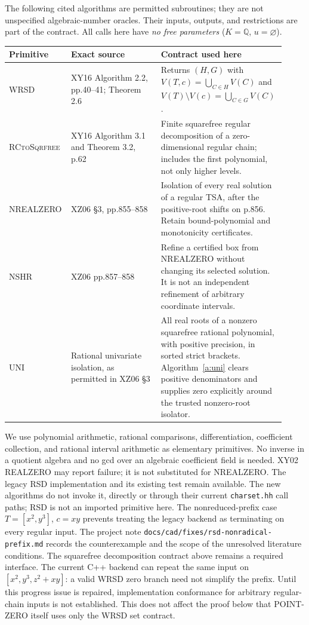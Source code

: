 \documentclass[11pt]{article}
\theoremstyle{definition}
\newcommand{\QQ}{\mathbb Q}
\newcommand{\alg}[1]{\textsc{#1}}
\begin{document}
The following cited algorithms are permitted subroutines; they are not unspecified
algebraic-number oracles. Their inputs, outputs, and restrictions are part of the
contract. All calls here have \emph{no free parameters} ($K=\QQ$, $u=\varnothing$).
\begin{longtable}{p{0.20\linewidth}p{0.32\linewidth}p{0.40\linewidth}}
\toprule Primitive & Exact source & Contract used here\\\midrule
\endhead
\alg{WRSD} & XY16 Algorithm 2.2, pp.40--41; Theorem 2.6 &
Returns $(H,G)$ with $V(T,c)=\bigcup_{C\in H}V(C)$ and
$V(T)\setminus V(c)=\bigcup_{C\in G}V(C)$.\\
\alg{RCtoSqrfree} & XY16 Algorithm 3.1 and Theorem 3.2, p.62 &
Finite squarefree regular decomposition of a zero-dimensional regular chain;
includes the first polynomial, not only higher levels.\\
\alg{NREALZERO} & XZ06 \S3, pp.855--858 &
Isolation of every real solution of a regular TSA, after the positive-root shifts
on p.856. Retain bound-polynomial and monotonicity certificates.\\
\alg{NSHR} & XZ06 pp.857--858 &
Refine a certified box from NREALZERO without changing its selected solution.
It is not an independent refinement of arbitrary coordinate intervals.\\
\alg{UNI} & Rational univariate isolation, as permitted in XZ06 \S3 &
All real roots of a nonzero squarefree rational polynomial, with positive
precision, in sorted strict brackets. Algorithm~\ref{a:uni} clears positive
denominators and supplies zero explicitly around the trusted nonzero-root isolator.\\
\bottomrule
\end{longtable}
We use polynomial arithmetic, rational comparisons, differentiation, coefficient
collection, and rational interval arithmetic as elementary primitives. No inverse
in a quotient algebra and no gcd over an algebraic coefficient field is needed.
XY02 REALZERO may report failure; it is not substituted for NREALZERO.
The legacy RSD implementation and its existing test remain available.
The new algorithms do not invoke it, directly or through their current
\texttt{charset.hh} call paths; RSD is not an imported primitive here.
The nonreduced-prefix case $T=[x^2,y^3]$, $c=xy$ prevents treating the
legacy backend as terminating on every regular input. The project note
\texttt{docs/cad/fixes/rsd-nonradical-prefix.md} records the counterexample
and the scope of the unresolved literature conditions.
The squarefree decomposition contract above remains a required interface.
The current C++ backend can repeat the same input on
$[x^2,y^3,z^2+xy]$: a valid WRSD zero branch need not simplify the prefix.
Until this progress issue is repaired, implementation conformance for arbitrary
regular-chain inputs is not established. This does not affect the proof below
that POINT-ZERO itself uses only the WRSD set contract.
\end{document}
